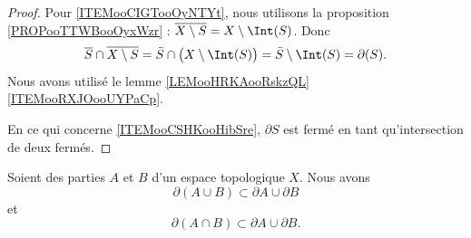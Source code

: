 \begin{proof}
	Pour \ref{ITEMooCIGTooOyNTYt}, nous utilisons la proposition \ref{PROPooTTWBooOyxWzr} : \( \overline{X\setminus S}=X\setminus\Int(S)\). Donc
	\begin{equation}
		\overline{S}\cap\overline{X\setminus S}=\bar S\cap\big( X\setminus \Int(S) \big)=\bar S\setminus \Int(S)=\partial(S).
	\end{equation}
	Nous avons utilisé le lemme \ref{LEMooHRKAooRskzQL}\ref{ITEMooRXJOooUYPaCp}.

	En ce qui concerne \ref{ITEMooCSHKooHibSre}, \( \partial S\) est fermé en tant qu'intersection de deux fermés.
\end{proof}


\begin{proposition}	\label{PROPooKQXDooEnNJyn}
	Soient des parties \( A\) et \( B\) d'un espace topologique \( X\). Nous avons
	\begin{equation}
		\partial(A\cup B)\subset \partial A\cup\partial B
	\end{equation}
	et
	\begin{equation}
		\partial(A\cap B)\subset \partial A\cup\partial B.
	\end{equation}
\end{proposition}

